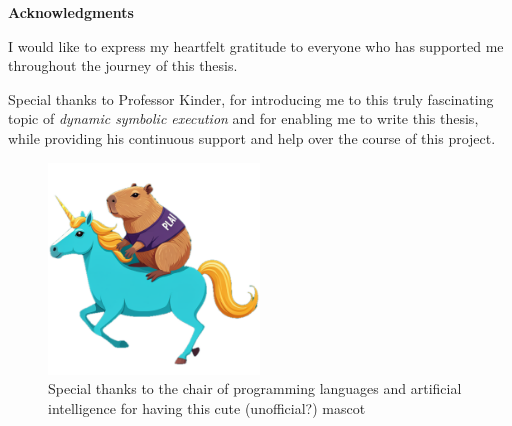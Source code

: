 \thispagestyle{empty}

\vspace*{20mm}

\begin{center}
    \makeatletter

    {\textbf{Acknowledgments}}

    \makeatother
\end{center}

\begin{flushleft}
    I would like to express my heartfelt gratitude to everyone who has supported me throughout the journey of this thesis.
    
    Special thanks to Professor Kinder, for introducing me to this truly fascinating topic of \textit{dynamic symbolic execution} and for enabling me to write this thesis, while providing his continuous support and help over the course of this project.

\begin{figure}[h] 
    \centering
    \includegraphics[width=0.5\textwidth]{images/ca-plai-corn.png}
    \caption{Special thanks to the chair of programming languages and artificial intelligence for having this cute (unofficial?) mascot}
\end{figure}


\end{flushleft}

\vspace{10mm}

\cleardoublepage{}
